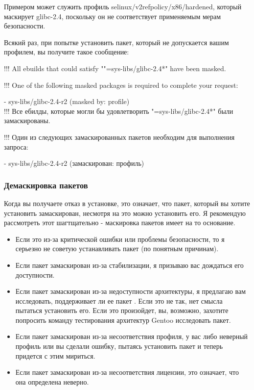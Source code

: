 \documentclass[10pt]{book}
\begin{document}
Примером может служить профиль  selinux/v2refpolicy/x86/hardened, который маскирует glibc-2.4, поскольку он не соответствует применяемым мерам безопасности.

Всякий раз, при попытке установить пакет, который не допускается вашим профилем, вы получите такое сообщение:

\begin{tcolorbox}
!!! All ebuilds that could satisfy ""=sys-libs/glibc-2.4*" have been masked.

!!! One of the following masked packages is required to complete your request:

- sys-libs/glibc-2.4-r2 (masked by: profile) \\

!!! Все ебилды, которые могли бы удовлетворить "=sys-libs/glibc-2.4*" были замаскированы.

!!! Один из следующих замаскированных пакетов необходим для выполнения запроса:

- sys-libs/glibc-2.4-r2 (замаскирован: профиль)
\end{tcolorbox}

\subsubsection{Демаскировка пакетов}
Когда вы получаете отказ в установке, это означает, что пакет, который вы хотите установить замаскирован, несмотря на это можно установить его. Я рекомендую рассмотреть этот шагтщательно  - маскировка пакетов имеет на то основание.

\begin{itemize}
 
\item Если это из-за критической ошибки или проблемы безопасности, то я серьезно не советую устанавливать пакет (по понятным причинам).
\item Если пакет замаскирован из-за стабилизации, я призываю вас дождаться его доступности.
\item Если пакет замаскирован из-за недоступности архитектуры, я предлагаю вам исследовать, поддерживает ли ее пакет . Если это не так, нет смысла пытаться установить его. Если это произойдет, вы, возможно, захотите попросить команду тестирования архитектур Gentoo исследовать пакет.
\item Если пакет замаскирован из-за несоответствия профиля, у вас либо неверный профиль или вы сделали ошибку, пытаясь установить пакет и теперь придется с этим мириться.
\item Если пакет замаскирован из-за несоответствия лицензии, это означает, что она определена неверно.
\end{itemize}
\end{document}
